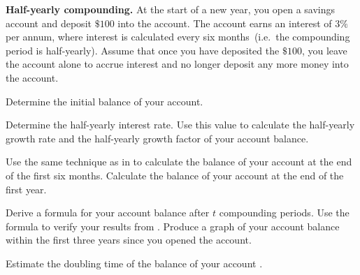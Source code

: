 \documentclass[a4paper,oneside,12pt]{article}
\begin{document}
\begin{example}
\label{eg:exponential:savings_6months}
\textbf{Half-yearly compounding.}
At the start of a new year, you open a savings account and deposit
$\$100$ into the account.  The account earns an interest of $3\%$ per
annum, where interest is calculated every six months~(i.e.~the
compounding period is half-yearly).  Assume that once you have
deposited the $\$100$, you leave the account alone to accrue interest
and no longer deposit any more money into the account.
\begin{packedenum}
\item\label{subeg:exponential:savings_6months_initial_balance}
  Determine the initial balance of your account.

\item\label{subeg:exponential:savings_6months_growth_rate}
  Determine the half-yearly interest rate.  Use this value to
  calculate the half-yearly growth rate and the half-yearly growth
  factor of your account balance.

\item\label{subeg:exponential:savings_6months_balance_first_year}
  Use the same technique as in
  to calculate the balance of your account at the end of the first six
  months.  Calculate the balance of your account at the end of the
  first year.

\item\label{subeg:exponential:savings_6months_balance_formula}
  Derive a formula for your account balance after $t$ compounding
  periods.  Use the formula to verify your results
  from .
  Produce a graph of your account balance within the first three years
  since you opened the account.

\item\label{subeg:exponential:savings_6months_doubling_time}
  Estimate the doubling time of the balance of your account .
\end{packedenum}
\end{example}
\end{document}
